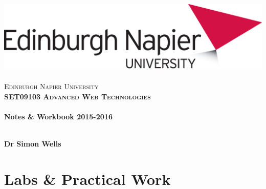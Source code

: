 \documentclass[12pt, a4paper, twoside]{book}
\begin{document}
\frontmatter

\begin{titlepage}
\vspace*{5cm}
\begin{center}
\includegraphics[width=.5\textwidth]{images/EdNapUniLogoCMYK}~\\[1cm]

\textsc{\Large Edinburgh Napier University}\\[1.5cm]

\textsc{\LARGE \bfseries SET09103 Advanced Web Technologies}\\[0.5cm]

\hrulefill \\[0.4cm]
{\huge \bfseries Notes \& Workbook 2015-2016 \\[0.4cm] }
\hrulefill \\[1.5cm]

\begin{minipage}{0.4\textwidth}
\begin{flushleft} \large
\textbf{Dr Simon Wells} \\
\end{flushleft}
\end{minipage}

\vfill

\end{center}
\end{titlepage}


\setcounter{tocdepth}{2}
\cleardoublepage
\tableofcontents
\listoffigures
{}

\mainmatter



\part{Labs \& Practical Work}
\end{document}
